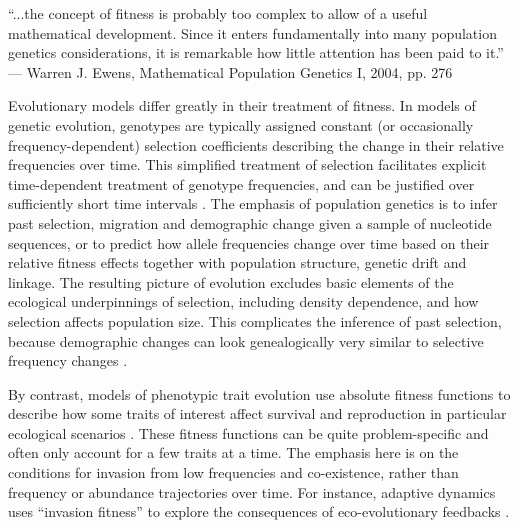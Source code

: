 \documentclass[11pt]{article}
\begin{document}
\newpage{}


``...the concept of fitness is probably too complex to allow of a useful mathematical development. Since it enters fundamentally into many population genetics considerations, it is remarkable how little attention has been paid to it.'' --- Warren J. Ewens, Mathematical Population Genetics I, 2004, pp. 276

Evolutionary models differ greatly in their treatment of fitness. In models of genetic evolution, genotypes are typically assigned constant (or occasionally frequency-dependent) selection coefficients describing the change in their relative frequencies over time. This simplified treatment of selection facilitates explicit time-dependent treatment of genotype frequencies, and can be justified over sufficiently short time intervals \citep[p. 276]{ewens_2004}. The emphasis of population genetics is to infer past selection, migration and demographic change given a sample of nucleotide sequences, or to predict how allele frequencies change over time based on their relative fitness effects together with population structure, genetic drift and linkage. The resulting picture of evolution excludes basic elements of the ecological underpinnings of selection, including density dependence, and how selection affects population size. This complicates the inference of past selection, because demographic changes can look genealogically very similar to selective frequency changes \citep{barton_1998}. 


By contrast, models of phenotypic trait evolution use absolute fitness functions to describe how some traits of interest affect survival and reproduction in particular ecological scenarios \citep{metz_1992,diekmann_2004}. These fitness functions can be quite problem-specific and often only account for a few traits at a time. The emphasis here is on the conditions for invasion from low frequencies and co-existence, rather than frequency or abundance trajectories over time. For instance, adaptive dynamics uses ``invasion fitness'' to explore the consequences of eco-evolutionary feedbacks \citep{diekmann_2004}.
\end{document}
